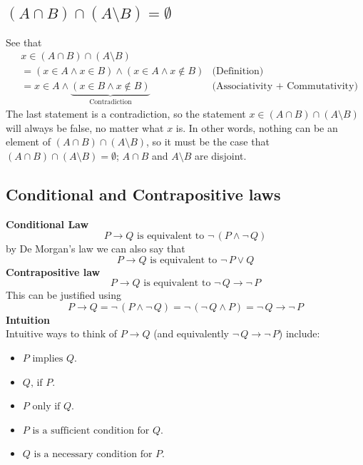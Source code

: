 \documentclass{report}
\theoremstyle{definition}
\begin{document}
\subsection{$(A\cap B)\cap(A\setminus B)=\emptyset$}
See that
\begin{align*}
&x\in(A\cap B)\cap(A\setminus B)&\\
&=(x\in A\land x\in B)\land(x\in A\land x\notin B)&\text{(Definition)}\\
&=x\in A\land\underbrace{(x\in B\land x\notin B)}_{\text{Contradiction}}&\text{(Associativity + Commutativity)}
\end{align*}
The last statement is a contradiction, so the statement 
$x\in(A\cap B)\cap(A\setminus B)$ will always be false, no matter what $x$ is. In other words, nothing can be an element of 
$(A\cap B)\cap(A\setminus B)$, so it must be the case that 
$(A\cap B)\cap(A\setminus B)=\emptyset$; $A\cap B$ and $A\setminus B$ are disjoint.
\newpage

\subsection{Conditional and Contrapositive laws}
\textbf{Conditional Law}
\begin{equation*}
P\to Q\text{ is equivalent to }\neg\,(P\land\neg\,Q)
\end{equation*}
by De Morgan's law we can also say that
\begin{equation*}
P\to Q\text{ is equivalent to }\neg\,P\lor Q
\end{equation*}
\textbf{Contrapositive law}
\begin{equation*}
P\to Q\text{ is equivalent to }\neg\,Q\to\neg\,P
\end{equation*}
This can be justified using
\begin{equation*}
P\to Q=\neg\,(P\land\neg\,Q)=\neg\,(\neg\,Q\land P)=\neg\,Q\to\neg\,P
\end{equation*}
\textbf{Intuition}\\
Intuitive ways to think of $P\to Q$ (and equivalently $\neg\,Q\to\neg\,P$) include:
\begin{itemize}
\item $P\text{ implies }Q$.
\item $Q\text{, if }P$.
\item $P\text{ only if }Q$.
\item $P\text{ is a sufficient condition for }Q$.
\item $Q\text{ is a necessary condition for }P$.
\end{itemize}
\newpage
\end{document}
